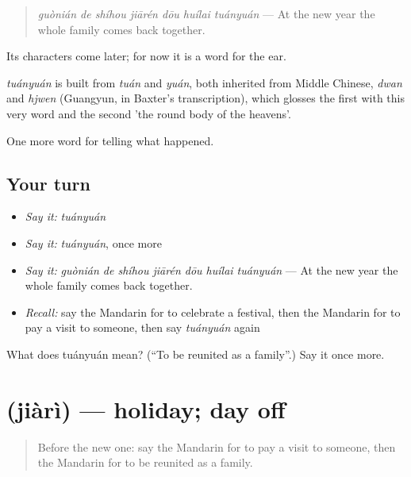 \begin{quote}
\emph{guònián de shíhou jiārén dōu huílai tuányuán} — At the new year the whole family comes back together.
\end{quote}

Its characters come later; for now it is a word for the ear.

\begin{cousinweb}
\emph{tuányuán} is built from \emph{tuán} and \emph{yuán}, both inherited from Middle Chinese, \emph{dwan} and \emph{hjwen} (Guangyun, in Baxter's transcription), which glosses the first with this very word and the second 'the round body of the heavens'.
\end{cousinweb}

\begin{grammarlens}[title={What you've built}]
One more word for telling what happened.
\end{grammarlens}

\subsection*{Your turn}
\begin{itemize}
\raggedright
  \item \emph{Say it:} \emph{tuányuán}
  \item \emph{Say it:} \emph{tuányuán}, once more
  \item \emph{Say it:} \emph{guònián de shíhou jiārén dōu huílai tuányuán} — At the new year the whole family comes back together.
  \item \emph{Recall:} say the Mandarin for to celebrate a festival, then the Mandarin for to pay a visit to someone, then say \emph{tuányuán} again
\end{itemize}

\begin{tcolorbox}[breakable,colback=teal!4,colframe=teal!35!black,title={Before you move on}]
What does tuányuán mean? (\textquotedblleft{}To be reunited as a family\textquotedblright{}.) Say it once more.
\end{tcolorbox}
\section[\texorpdfstring{\zh{假日} (jiàrì)}{假日 (jiàrì)}]{ (jiàrì) — holiday; day off}

\label{lesson:ZH-C338-jiari}



\begin{quote}
Before the new one: say the Mandarin for to pay a visit to someone, then the Mandarin for to be reunited as a family.
\end{quote}

